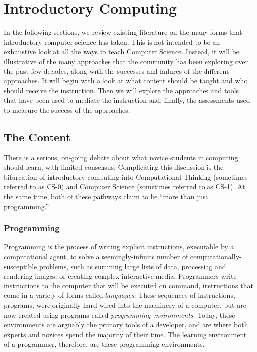 \section{Introductory Computing}

In the following sections, we review existing literature on the many forms that introductory computer science has taken.
This is not intended to be an exhaustive look at all the ways to teach Computer Science.
Instead, it will be illustrative of the many approaches that the community has been exploring over the past few decades, along with the successes and failures of the different approaches.
It will begin with a look at what content should be taught and who should receive the instruction.
Then we will explore the approaches and tools that have been used to mediate the instruction and, finally, the assessments used to measure the success of the approaches.

\subsection{The Content}

There is a serious, on-going debate about what novice students in computing should learn, with limited consensus. 
Complicating this discussion is the bifurcation of introductory computing into Computational Thinking (sometimes referred to as CS-0) and Computer Science (sometimes referred to as CS-1).
At the same time, both of these pathways claim to be ``more than just programming.''


\subsubsection{Programming}

Programming is the process of writing explicit instructions, executable by a computational agent, to solve a seemingly-infinite number of computationally-susceptible problems, such as summing large lists of data, processing and rendering images, or creating complex interactive media. Programmers write instructions to the computer that will be executed on command, instructions that come in a variety of forms called \textit{languages}. These sequences of instructions, programs, were originally hard-wired into the machinery of a computer, but are now created using programs called \textit{programming environments}. Today, these environments are arguably the primary tools of a developer, and are where both experts and novices spend the majority of their time. The learning environment of a programmer, therefore, are these programming environments.

